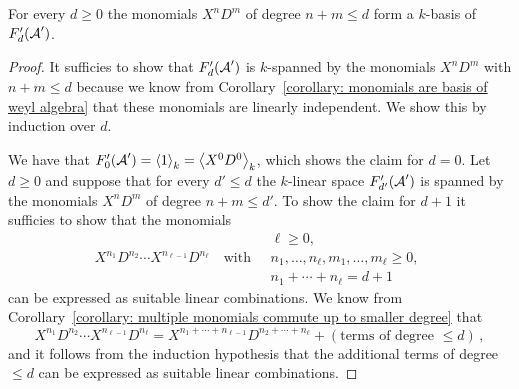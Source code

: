 \begin{corollary}
  \label{corollary: basis of filtration subspaces}
  For every $d \geq 0$ the monomials $X^n D^m$ of degree $n + m \leq d$ form a $k$-basis of $F'_d(\operatorname{\mathcal{A}}')$.
\end{corollary}


\begin{proof}
  It sufficies to show that $F'_d(\operatorname{\mathcal{A}}')$ is $k$-spanned by the monomials $X^n D^m$ with $n+m \leq d$ because we know from Corollary~\ref{corollary: monomials are basis of weyl algebra} that these monomials are linearly independent.
  We show this by induction over $d$.
  
  We have that $F'_0(\operatorname{\mathcal{A}}') = \left\langle 1 \right\rangle_k = \left\langle X^0 D^0 \right\rangle_k$, which shows the claim for $d = 0$.
  Let $d \geq 0$ and suppose that for every $d' \leq d$ the $k$-linear space $F'_{d'}(\operatorname{\mathcal{A}}')$ is spanned by the monomials $X^n D^m$ of degree $n + m \leq d'$.
  To show the claim for $d + 1$ it sufficies to show that the monomials
  \[
    X^{n_1} D^{n_2} \dotsm X^{n_{\ell-1}} D^{n_\ell}
    \quad\text{with}\quad
    \begin{array}{c}
      \ell \geq 0,  \\
      n_1, \dotsc, n_\ell, m_1, \dotsc, m_\ell \geq 0,  \\
      n_1 + \dotsb + n_\ell = d + 1
    \end{array}
  \]
  can be expressed as suitable linear combinations.
  We know from Corollary~\ref{corollary: multiple monomials commute up to smaller degree} that
  \[
      X^{n_1} D^{n_2} \dotsm X^{n_{\ell-1}} D^{n_\ell}
    =   X^{n_1 + \dotsb + n_{\ell-1}} D^{n_2 + \dotsb + n_\ell}
      + (\text{terms of degree $\leq d$}) \,,
  \]
  and it follows from the induction hypothesis that the additional terms of degree $\leq d$ can be expressed as suitable linear combinations.
\end{proof}


